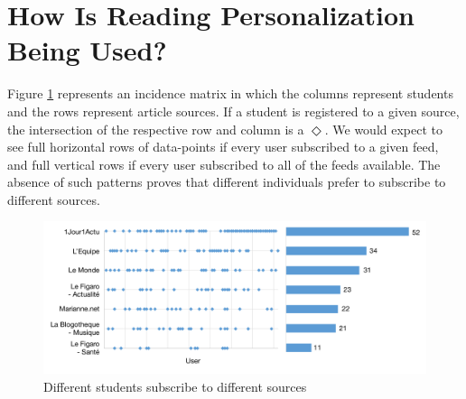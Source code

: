
\newpage
\section{How Is Reading Personalization Being Used?}
\label{sec:results}


Figure \ref{fig:subscriptions} represents an incidence matrix in which the columns represent students and the rows represent article sources. If a student is registered to a given source, the intersection of the respective row and column is a $\Diamond$. 
% 
We would expect to see full horizontal rows of data-points if every user subscribed to a given feed, and full vertical rows if every user subscribed to all of the feeds available. The absence of such patterns proves that different individuals prefer to subscribe to different sources.


\begin{figure}[h!]

\centering
  \includegraphics[width=\columnwidth]{figures/subscriptions}
  \caption{Different students subscribe to different sources}
  \label{fig:subscriptions}  
\end{figure}

